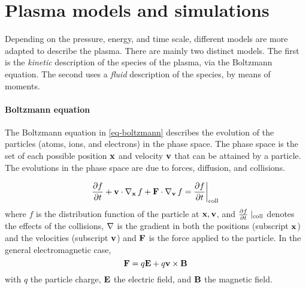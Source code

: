

\section*{Plasma models and simulations}
\label{sec-simulations}

Depending on the pressure, energy, and time scale, different models are more adapted to describe the plasma.
There are mainly two distinct models.
The first is the \emph{kinetic} description of the species of the plasma, via the Boltzmann equation.
The second uses a \emph{fluid} description of the species, by means of moments.
% 


\paragraph{Boltzmann equation \\}
The Boltzmann equation in \cref{eq-boltzmann} describes the evolution of the particles (atoms, ions, and electrons) in the phase space.
The phase space is the set of each possible position ${\mathbf x}$ and velocity ${\mathbf v}$ that can be attained by a particle.
The evolutions in the phase space are due to forces, diffusion, and collisions.

\begin{equation} \label{eq-boltzmann}
\frac{\partial f}{\partial t}  + {\mathbf v} \cdot \operatorname{{\mathbf \nabla}}_{{\mathbf x}} f + {\mathbf F} \cdot  \operatorname{{\mathbf \nabla}}_{{\mathbf v}} f = \frac{\partial f}{\partial t}  \bigg\vert_{\rm coll} 
\end{equation}
where $f$ is the distribution function of the particle at ${\mathbf x}, {\mathbf v}$, and $\frac{\partial f}{\partial t}\mid_{\rm coll}$ denotes the effects of the collisions, $\operatorname{{\mathbf \nabla}}$ is the gradient in both the positions (subscript ${\mathbf x}$) and the velocities (subscript ${\mathbf v}$)  and ${\mathbf F}$ is the force applied to the particle.
In the general electromagnetic case,
\begin{equation*} \label{eq-forceEM}
  {\mathbf F} =  q {\mathbf E} + q {\mathbf v} \times {\mathbf B}
\end{equation*}
with $q$ the particle charge, ${\mathbf E}$ the electric field, and ${\mathbf B}$ the magnetic field.

